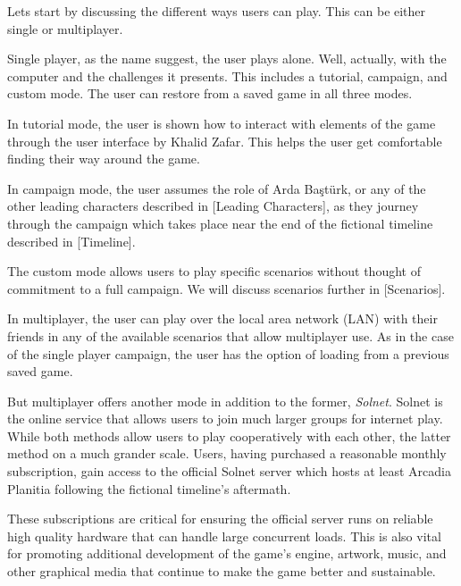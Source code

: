 

Lets start by discussing the different ways users can play. This can be either single or multiplayer.

Single player, as the name suggest, the user plays alone. Well, actually, with the computer and the challenges it presents. This includes a tutorial, campaign, and custom mode. The user can restore from a saved game in all three modes.

In tutorial mode, the user is shown how to interact with elements of the game through the user interface by Khalid Zafar. This helps the user get comfortable finding their way around the game.

In campaign mode, the user assumes the role of Arda Baştürk, or any of the other leading characters described in [Leading Characters], as they journey through the campaign which takes place near the end of the fictional timeline described in [Timeline]. 

The custom mode allows users to play specific scenarios without thought of commitment to a full campaign. We will discuss scenarios further in [Scenarios]. 

In multiplayer, the user can play over the local area network (LAN) with their friends in any of the available scenarios that allow multiplayer use. As in the case of the single player campaign, the user has the option of loading from a previous saved game.

But multiplayer offers another mode in addition to the former, {\it Solnet}. Solnet is the online service that allows users to join much larger groups for internet play. While both methods allow users to play cooperatively with each other, the latter method on a much grander scale. Users, having purchased a reasonable monthly subscription, gain access to the official Solnet server which hosts at least Arcadia Planitia following the fictional timeline's aftermath. 

These subscriptions are critical for ensuring the official server runs on reliable high quality hardware that can handle large concurrent loads. This is also vital for promoting additional development of the game's engine, artwork, music, and other graphical media that continue to make the game better and sustainable.

